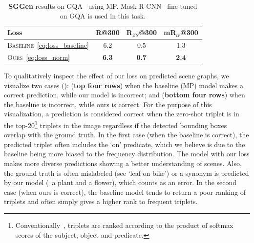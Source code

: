 \begin{table}
	\centering
	\caption{\small \textbf{SGGen} results on GQA~\citep{hudson2019gqa} using MP. Mask R-CNN~\citep{he2017mask} fine-tuned on GQA is used in this task.}\label{table:gqa_sgg}
	\footnotesize
	\vspace{-3pt}
	\begin{tabular}{lccc} 
		\toprule
		\textbf{Loss} & \footnotesize R@300 & \footnotesize R$_{ZS}$@300 &  \footnotesize mR$_{tr}$@300\Bstrut\Tstrut\\
		\midrule
		\textsc{Baseline}~\eqref{eq:loss_baseline} & 6.2 & 0.5 & 1.3 \Tstrut \\ 
		\textsc{Ours}~\eqref{eq:loss_norm}  & \textbf{6.3} & \textbf{0.7} & \textbf{2.4} \Bstrut\\
		\bottomrule 
	\end{tabular}
\end{table} 

To qualitatively inspect the effect of our loss on predicted scene graphs, we visualize two cases (\fig{\ref{fig:example}}): (\textbf{top four rows}) when the baseline (MP) model makes a correct prediction, while our model is incorrect; and (\textbf{bottom four rows}) when the baseline is incorrect, while ours is correct. For the purpose of this visualization, a prediction is considered correct when the zero-shot triplet is in the top-20\footnote{Conventionally~\citep{xu2017scene,zellers2018neural}, triplets are ranked according to the product of softmax scores of the subject, object and predicate.} triplets in the image regardless if the detected bounding boxes overlap with the ground truth. In the first case (when the baseline is correct), the predicted triplet often includes the `on' predicate, which we believe is due to the baseline being more biased to the frequency distribution. The model with our loss makes more diverse predictions showing a better understanding of scenes. Also, the ground truth is often mislabeled (see `leaf on bike') or a synonym is predicted by our model (\eg~a plant and a flower), which counts as an error. In the second case (when ours is correct), the baseline model tends to return a poor ranking of triplets and often simply gives a higher rank to frequent triplets. 


